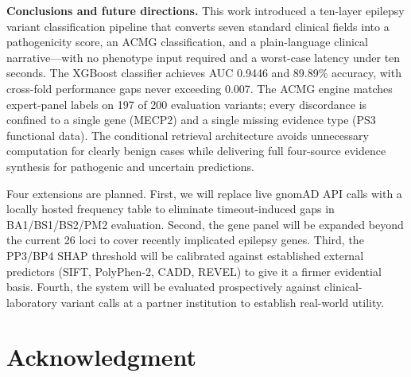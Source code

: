 \documentclass[12pt,a4paper]{article}
\begin{document}
\textbf{Conclusions and future directions.}
This work introduced a ten-layer epilepsy variant classification
pipeline that converts seven standard clinical fields into a
pathogenicity score, an ACMG classification, and a plain-language
clinical narrative---with no phenotype input required and a
worst-case latency under ten seconds. The XGBoost classifier
achieves AUC 0.9446 and 89.89\% accuracy, with cross-fold
performance gaps never exceeding 0.007. The ACMG engine matches
expert-panel labels on 197 of 200 evaluation variants; every
discordance is confined to a single gene (MECP2) and a single
missing evidence type (PS3 functional data). The conditional
retrieval architecture avoids unnecessary computation for clearly
benign cases while delivering full four-source evidence synthesis
for pathogenic and uncertain predictions.

Four extensions are planned. First, we will replace live gnomAD
API calls with a locally hosted frequency table to eliminate
timeout-induced gaps in BA1/BS1/BS2/PM2 evaluation. Second, the
gene panel will be expanded beyond the current 26 loci to cover
recently implicated epilepsy genes. Third, the PP3/BP4 SHAP
threshold will be calibrated against established external
predictors (SIFT, PolyPhen-2, CADD, REVEL) to give it a firmer
evidential basis. Fourth, the system will be evaluated
prospectively against clinical-laboratory variant calls at a
partner institution to establish real-world utility.

\section*{Acknowledgment}
\end{document}
